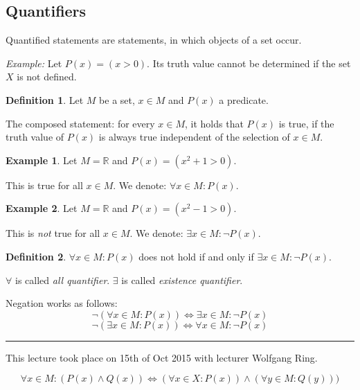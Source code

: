 \documentclass[a4paper,landscape,twocolumn]{article}
\theoremstyle{definition}
\newtheorem{defi}{Definition}
\newtheorem{ex}{Example}
\newcommand\meta[3]{\hrule{} This #1 took place on #2 with lecturer #3.\par}
\begin{document}
\subsection{Quantifiers}
%
Quantified statements are statements, in which objects of a set occur.

\emph{Example:} Let $P(x) = (x > 0)$. Its truth value cannot be determined
if the set $X$ is not defined.

\begin{defi}
  Let $M$ be a set, $x \in M$ and $P(x)$ a predicate.

  The composed statement: for every $x \in M$, it holds that $P(x)$ is true,
  if the truth value of $P(x)$ is always true independent of the selection of $x \in M$.
\end{defi}

\begin{ex}
  Let $M = \mathbb R$ and $P(x) = (x^2 + 1 > 0)$.

  This is true for all $x \in M$.
  We denote: $\forall x \in M: P(x)$.
\end{ex}

\begin{ex}
  Let $M = \mathbb R$ and $P(x) = (x^2 - 1 > 0)$.

  This is \emph{not} true for all $x \in M$.
  We denote: $\exists x \in M: \neg P(x)$.
\end{ex}

\begin{defi}
  $\forall x \in M: P(x)$ does not hold if and only if $\exists x \in M: \neg P(x)$.

  $\forall$ is called \emph{all quantifier}.
  $\exists$ is called \emph{existence quantifier}.

  Negation works as follows:
  \[ \neg\left(\forall x \in M: P(x)\right) \Leftrightarrow \exists x \in M: \neg P(x) \]
  \[ \neg\left(\exists x \in M: P(x)\right) \Leftrightarrow \forall x \in M: \neg P(x) \]
\end{defi}


\meta{lecture}{15th of Oct 2015}{Wolfgang Ring}

\[ \forall x \in M: (P(x) \land Q(x)) \iff (\forall x \in X: P(x)) \land (\forall y \in M: Q(y))) \]
\end{document}
